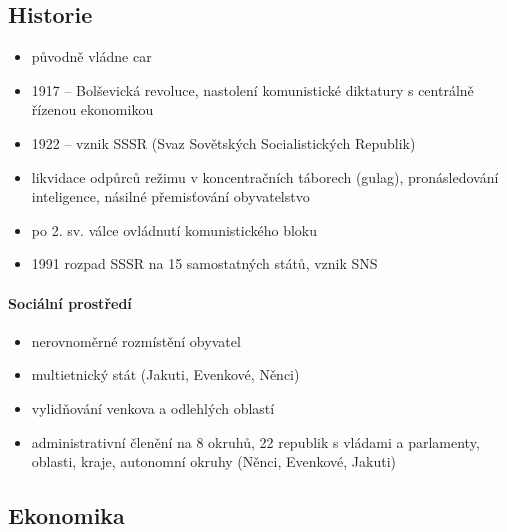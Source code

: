 \subsection{Historie}
\begin{itemize}
\item původně vládne car
\item 1917 -- Bolševická revoluce, nastolení komunistické diktatury s centrálně řízenou ekonomikou
\item 1922 -- vznik SSSR (Svaz Sovětských Socialistických Republik)
\item likvidace odpůrců režimu v koncentračních táborech (gulag), pronásledování inteligence, násilné přemisťování obyvatelstvo
\item po 2. sv. válce ovládnutí komunistického bloku
\item 1991 rozpad SSSR na 15 samostatných států, vznik SNS
\end{itemize}

\paragraph{Sociální prostředí}
\begin{itemize}
\item nerovnoměrné rozmístění obyvatel
\item multietnický stát (Jakuti, Evenkové, Něnci)
\item vylidňování venkova a odlehlých oblastí
\item administrativní členění na 8 okruhů, 22 republik s vládami a parlamenty, oblasti, kraje, autonomní okruhy (Něnci, Evenkové, Jakuti)
\end{itemize}

\subsection{Ekonomika}

